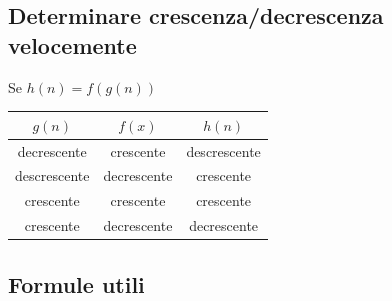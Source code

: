 \documentclass[10pt, a4paper]{article}
\begin{document}
    \subsection{Determinare crescenza/decrescenza velocemente}
        Se $h(n)=f(g(n))$
        \begin{center}
            \begin{tabular}{| c | c | c |}
                \hline
                $g(n)$ & $f(x)$ & $h(n)$\\
                \hline
                decrescente & crescente & descrescente\\
                \hline
                descrescente & decrescente & crescente\\
                \hline
                crescente & crescente & crescente\\
                \hline
                crescente & decrescente & decrescente\\
                \hline
            \end{tabular}
        \end{center}
    \subsection{Formule utili}
\end{document}
